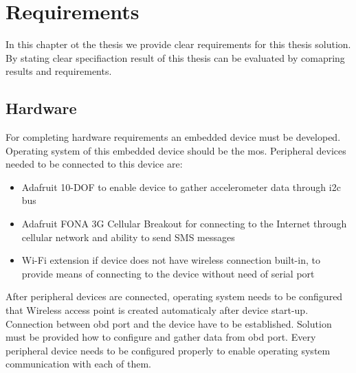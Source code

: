 \section{Requirements}
In this chapter ot the thesis we provide clear requirements for this thesis solution. By stating clear specifiaction result of this thesis can be evaluated by comapring results and requirements.
\subsection{Hardware}
For completing hardware requirements an embedded device must be developed. Operating system of this embedded device should be the mos.
Peripheral devices needed to be connected to this device are:
\begin{itemize}
	\item Adafruit 10-DOF to enable device to gather accelerometer data through \gls{i2c} bus
	\item Adafruit FONA 3G Cellular Breakout for connecting to the Internet through cellular network and ability to send SMS messages
	\item Wi-Fi extension if device does not have wireless connection built-in, to provide means of connecting to the device without need of serial port
\end{itemize}
After peripheral devices are connected, operating system needs to be configured that Wireless access point is created automaticaly after device start-up. Connection between \gls{obd} port and the device have to be established. Solution must be provided how to configure and gather data from \gls{obd} port. Every peripheral device needs to be configured properly to enable operating system communication with each of them.
